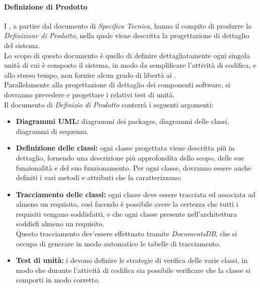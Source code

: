 	\paragraph{Definizione di Prodotto}
	I \textit{\Progs}, a partire dal documento di \textit{Specifica Tecnica}, hanno il compito di produrre la \textit{Definizione di Prodotto}, nella quale viene descritta la progettazione di dettaglio del sistema.\\
	Lo scopo di questo documento è quello di definire dettagliatamente ogni singola unità
	di cui è composto il sistema, in modo da semplificare l’attività di codifica, e allo stesso
	tempo, non fornire alcun grado di libertà ai \textit{\Progrs}.\\
	Parallelamente alla progettazione di dettaglio dei componenti software, si dovranno prevedere e progettare i relativi test di unità.\\
	Il documento di \textit{Definizio di Prodotto} conterrà i seguenti argomenti:
	\begin{itemize}
		\item \textbf{Diagrammi UML:} diagrammi dei packages, diagrammi delle classi, diagrammi di sequenza.
		\item \textbf{Definizione delle classi:} ogni classe progettata viene descritta più in dettaglio, fornendo una descrizione più approfondita dello scopo, delle sue funzionalità e del suo funzionamento. Per ogni classe, dovranno essere anche definiti i vari metodi e attributi che la caratterizzano;
		\item \textbf{Tracciamento delle classi:} ogni classe deve essere tracciata ed associata ad almeno un requisito, così facendo è possibile avere la certezza che tutti i requisiti vengano soddisfatti, e che ogni classe presente nell'architettura soddisfi almeno un requisito.\\
		Questo tracciamento dev'essere effettuato tramite \textit{DocumentsDB}, che si occupa di generare in modo automatico le tabelle di tracciamento.
		\item \textbf{Test di unità:} i \textit{\Progs} devono definire le strategie di verifica delle varie classi, in modo che durante l'attività di codifica sia possibile verificare che la classe si comporti in modo corretto.
	\end{itemize}
	
